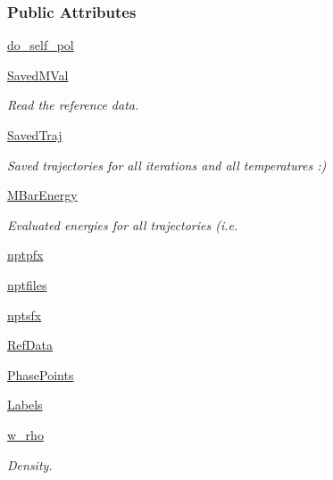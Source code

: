 \subsubsection*{Public Attributes}
\begin{DoxyCompactItemize}
\item 
\hyperlink{classforcebalance_1_1liquid_1_1Liquid_a2cf65dd56f058636e68a0b3bf2af210e}{do\-\_\-self\-\_\-pol}
\item 
\hyperlink{classforcebalance_1_1liquid_1_1Liquid_a5b9df1bf79a641156429e292f47b6afd}{Saved\-M\-Val}
\begin{DoxyCompactList}\small\item\em Read the reference data. \end{DoxyCompactList}\item 
\hyperlink{classforcebalance_1_1liquid_1_1Liquid_a0da0c00cdc193c9c470d7e528043fb99}{Saved\-Traj}
\begin{DoxyCompactList}\small\item\em Saved trajectories for all iterations and all temperatures \-:) \end{DoxyCompactList}\item 
\hyperlink{classforcebalance_1_1liquid_1_1Liquid_a6c00a87ae43f535118b77d41af51a5d7}{M\-Bar\-Energy}
\begin{DoxyCompactList}\small\item\em Evaluated energies for all trajectories (i.\-e. \end{DoxyCompactList}\item 
\hyperlink{classforcebalance_1_1liquid_1_1Liquid_a0560795c55fc1b5d7668951c77ad97ab}{nptpfx}
\item 
\hyperlink{classforcebalance_1_1liquid_1_1Liquid_a2030a7e21fcce59155a0258daed4f2f7}{nptfiles}
\item 
\hyperlink{classforcebalance_1_1liquid_1_1Liquid_a4125a209929444b7cbfbd60b466dc763}{nptsfx}
\item 
\hyperlink{classforcebalance_1_1liquid_1_1Liquid_a472f32bbaf18b8ead19b9156f305b8fc}{Ref\-Data}
\item 
\hyperlink{classforcebalance_1_1liquid_1_1Liquid_a2c10490d9073a069bd19361f386422ef}{Phase\-Points}
\item 
\hyperlink{classforcebalance_1_1liquid_1_1Liquid_a50f976d2d3d6a1c261756035a26390e2}{Labels}
\item 
\hyperlink{classforcebalance_1_1liquid_1_1Liquid_aef8ad1dda086bde6f48130d273af9784}{w\-\_\-rho}
\begin{DoxyCompactList}\small\item\em Density. \end{DoxyCompactList}\item 

\end{DoxyCompactItemize}
